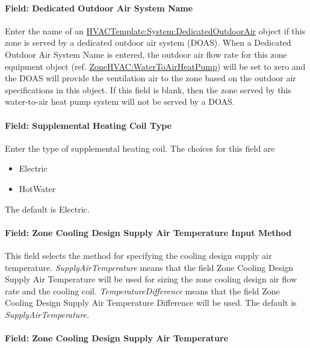 \paragraph{Field: Dedicated Outdoor Air System Name}\label{field-dedicated-outdoor-air-system-name-4}

Enter the name of an \hyperref[hvactemplatesystemdedicatedoutdoorair]{HVACTemplate:System:DedicatedOutdoorAir} object if this zone is served by a dedicated outdoor air system (DOAS). When a Dedicated Outdoor Air System Name is entered, the outdoor air flow rate for this zone equipment object (ref. \hyperref[zonehvacwatertoairheatpump]{ZoneHVAC:WaterToAirHeatPump}) will be set to zero and the DOAS will provide the ventilation air to the zone based on the outdoor air specifications in this object. If this field is blank, then the zone served by this water-to-air heat pump system will not be served by a DOAS.

\paragraph{Field: Supplemental Heating Coil Type}\label{field-supplemental-heating-coil-type-1}

Enter the type of supplemental heating coil. The choices for this field are

\begin{itemize}
\item
  Electric
\item
  HotWater
\end{itemize}

The default is Electric.

\paragraph{Field: Zone Cooling Design Supply Air Temperature Input Method}\label{field-zone-cooling-design-supply-air-temperature-input-method-3}

This field selects the method for specifying the cooling design supply air temperature. \emph{SupplyAirTemperature} means that the field Zone Cooling Design Supply Air Temperature will be used for sizing the zone cooling design air flow rate and the cooling coil. \emph{TemperatureDifference} means that the field Zone Cooling Design Supply Air Temperature Difference will be used. The default is \emph{SupplyAirTemperature.}

\paragraph{Field: Zone Cooling Design Supply Air Temperature}\label{field-zone-cooling-design-supply-air-temperature-2}

